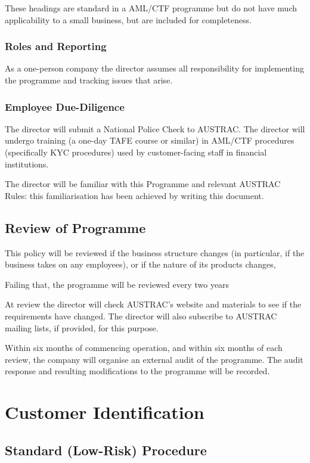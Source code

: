\documentclass[12pt]{report}
\begin{document}
These headings are standard in a AML/CTF programme but do not have much applicability to a small business, but are included for completeness.

\subsection{Roles and Reporting}

As a one-person company the director assumes all responsibility for implementing the programme and tracking issues that arise.

\subsection{Employee Due-Diligence}

The director will submit a National Police Check to AUSTRAC. The director will undergo training (a one-day TAFE course
or similar) in AML/CTF procedures (specifically KYC procedures) used by customer-facing staff in financial institutions.

The director will be familiar with this Programme and relevant AUSTRAC Rules: this familiarisation has been achieved by writing this document. 

\section{Review of Programme}

This policy will be reviewed if the business structure changes (in particular, if the business takes on any
employees), or if the nature of its products changes,

Failing that, the programme will be reviewed every two years

At review the director will check AUSTRAC's website and materials to see if the requirements have changed.
The director will also subscribe to AUSTRAC mailing lists, if provided, for this purpose.

Within six months of commencing operation, and within six months of each review, the company will
organise an external audit of the programme. The audit response and resulting modifications to the programme will be
recorded.

\chapter{Customer Identification}

\section{Standard (Low-Risk) Procedure} \label{standard}
\end{document}
